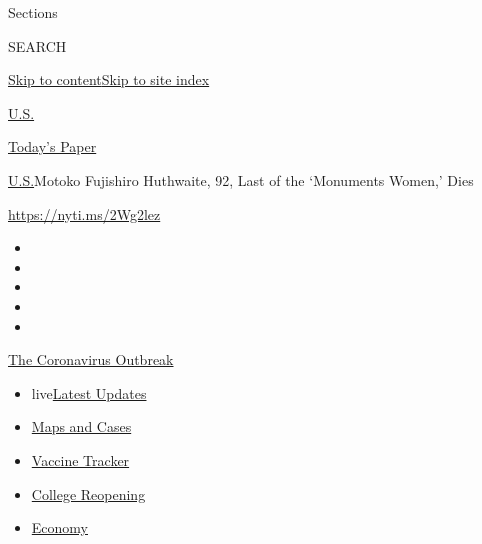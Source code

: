 Sections

SEARCH

\protect\hyperlink{site-content}{Skip to
content}\protect\hyperlink{site-index}{Skip to site index}

\href{https://www.nytimes.com/section/us}{U.S.}

\href{https://myaccount.nytimes.com/auth/login?response_type=cookie\&client_id=vi}{}

\href{https://www.nytimes.com/section/todayspaper}{Today's Paper}

\href{/section/us}{U.S.}\textbar{}Motoko Fujishiro Huthwaite, 92, Last
of the `Monuments Women,' Dies

\url{https://nyti.ms/2Wg2lez}

\begin{itemize}
\item
\item
\item
\item
\item
\end{itemize}

\href{https://www.nytimes.com/news-event/coronavirus?action=click\&pgtype=Article\&state=default\&region=TOP_BANNER\&context=storylines_menu}{The
Coronavirus Outbreak}

\begin{itemize}
\tightlist
\item
  live\href{https://www.nytimes.com/2020/08/03/world/coronavirus-covid-19.html?action=click\&pgtype=Article\&state=default\&region=TOP_BANNER\&context=storylines_menu}{Latest
  Updates}
\item
  \href{https://www.nytimes.com/interactive/2020/us/coronavirus-us-cases.html?action=click\&pgtype=Article\&state=default\&region=TOP_BANNER\&context=storylines_menu}{Maps
  and Cases}
\item
  \href{https://www.nytimes.com/interactive/2020/science/coronavirus-vaccine-tracker.html?action=click\&pgtype=Article\&state=default\&region=TOP_BANNER\&context=storylines_menu}{Vaccine
  Tracker}
\item
  \href{https://www.nytimes.com/2020/08/02/us/covid-college-reopening.html?action=click\&pgtype=Article\&state=default\&region=TOP_BANNER\&context=storylines_menu}{College
  Reopening}
\item
  \href{https://www.nytimes.com/live/2020/08/03/business/stock-market-today-coronavirus?action=click\&pgtype=Article\&state=default\&region=TOP_BANNER\&context=storylines_menu}{Economy}
\end{itemize}

